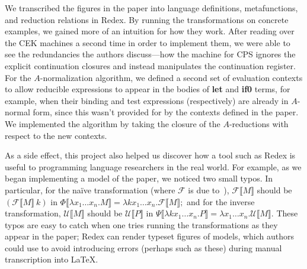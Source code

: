 \documentclass[11pt]{article}
\begin{document}
We transcribed the figures in the paper into language definitions,
metafunctions, and reduction relations in Redex. By running the transformations
on concrete examples, we gained more of an intuition for how they work. After
reading over the CEK machines a second time in order to implement them, we were
able to see the redundancies the authors discuss---how the machine for CPS
ignores the explicit continuation closures and instead manipulates the
continuation register.
%
For the $A$-normalization algorithm, we defined a second set %
of evaluation contexts to allow reducible expressions to appear in the bodies
of \textbf{let} and \textbf{if0} terms, for example, when their binding and
test expressions (respectively) are already in $A$-normal form, since this
wasn't provided for by the %
contexts defined in the paper.
%
%
We implemented the algorithm by taking the closure of the $A$-reductions with
respect to the new contexts.

As a side effect, this project also helped us discover how a tool such as Redex
is useful to programming language researchers in the real world. For example,
as we began implementing a model of the paper, we noticed two small typos. In
particular, for the na\"{i}ve transformation (where $\mathcal{F}$ is due
to~\citet{Fischer:1993ys}), $\mathcal{F}\llbracket{M\rrbracket}$ should be
$(\mathcal{F}\llbracket{M\rrbracket}\ k)$ in
$\Phi\llbracket{\lambda{x_1 \ldots x_n}.M\rrbracket} =
\lambda{k x_1 \ldots x_n}.\mathcal{F}\llbracket{M\rrbracket};$
and for the inverse transformation,
$\mathcal{U}\llbracket{M\rrbracket}$ should be
$\mathcal{U}\llbracket{P\rrbracket}$ in
$\Psi\llbracket{\lambda{k x_1 \ldots x_n}.P\rrbracket} =
\lambda{x_1 \ldots x_n}.\mathcal{U}\llbracket{M\rrbracket}.$
These typos are easy to catch when one tries running the transformations as
they appear in the paper; Redex can render typeset figures of models, which
authors could use to avoid introducing errors (perhaps such as these) during
manual transcription into \LaTeX.
%
\end{document}
